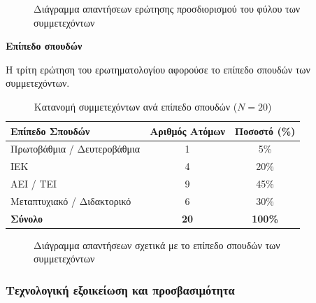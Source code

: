 \documentclass[twoside, a4paper, 11pt]{article}
\begin{document}
\begin{figure}[H]
    \centering
    \caption{Διάγραμμα απαντήσεων ερώτησης προσδιορισμού του φύλου των συμμετεχόντων}
\end{figure}

\vspace{1em}
\noindent\textbf{Επίπεδο σπουδών}

Η τρίτη ερώτηση του ερωτηματολογίου αφορούσε το επίπεδο σπουδών των συμμετεχόντων. 

\begin{table}[H]
    \centering
    \caption{Κατανομή συμμετεχόντων ανά επίπεδο σπουδών ($N = 20$)}
    \begin{tabular}{|l|c|c|}
        \hline
        \textbf{Επίπεδο Σπουδών} & \textbf{Αριθμός Ατόμων} & \textbf{Ποσοστό (\%)} \\ \hline
        Πρωτοβάθμια / Δευτεροβάθμια & 1 & 5\% \\ \hline
        ΙΕΚ & 4 & 20\% \\ \hline
        ΑΕΙ / ΤΕΙ & 9 & 45\% \\ \hline
        Μεταπτυχιακό / Διδακτορικό & 6 & 30\% \\ \hline
        \textbf{Σύνολο} & \textbf{20} & \textbf{100\%} \\ \hline
    \end{tabular}
\end{table}

\begin{figure}[H]
    \centering
    \caption{Διάγραμμα απαντήσεων σχετικά με το επίπεδο σπουδών των συμμετεχόντων}
\end{figure}


\subsubsection{Τεχνολογική εξοικείωση και προσβασιμότητα}
\end{document}
